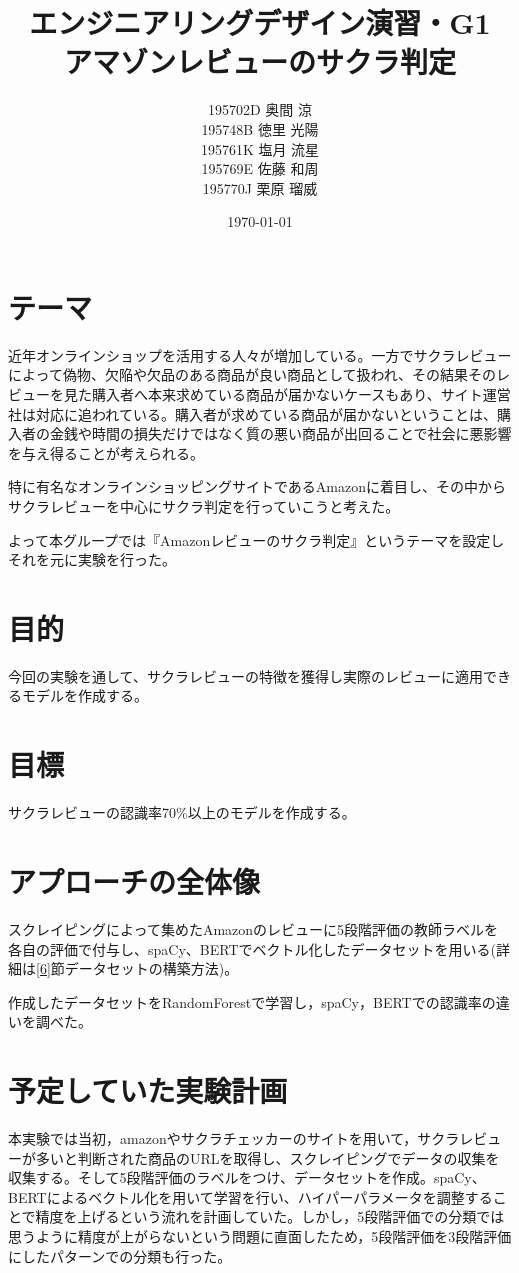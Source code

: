 \documentclass[a4paper,11pt,titlepage]{jsarticle}
\title{エンジニアリングデザイン演習・G1\\アマゾンレビューのサクラ判定}
\author{195702D  奥間 涼\\195748B 徳里 光陽\\195761K 塩月 流星\\195769E 佐藤 和周\\195770J 栗原 瑠威}
\date{\today}
\begin{document}
\maketitle
\tableofcontents
\clearpage
\section{テーマ}
近年オンラインショップを活用する人々が増加している。一方でサクラレビューによって偽物、欠陥や欠品のある商品が良い商品として扱われ、その結果そのレビューを見た購入者へ本来求めている商品が届かないケースもあり、サイト運営社は対応に追われている\cite{5}。購入者が求めている商品が届かないということは、購入者の金銭や時間の損失だけではなく質の悪い商品が出回ることで社会に悪影響を与え得ることが考えられる。

特に有名なオンラインショッピングサイトであるAmazonに着目し、その中からサクラレビューを中心にサクラ判定を行っていこうと考えた。

よって本グループでは『Amazonレビューのサクラ判定』というテーマを設定しそれを元に実験を行った。


\section{目的}
今回の実験を通して、サクラレビューの特徴を獲得し実際のレビューに適用できるモデルを作成する。

\section{目標}
サクラレビューの認識率70\%以上のモデルを作成する。

\section{アプローチの全体像}
スクレイピングによって集めたAmazonのレビューに5段階評価の教師ラベルを各自の評価で付与し、spaCy、BERTでベクトル化したデータセットを用いる(詳細は\ref{6}節データセットの構築方法)。

作成したデータセットをRandomForestで学習し，spaCy，BERTでの認識率の違いを調べた。

\section{予定していた実験計画}
本実験では当初，amazonやサクラチェッカー\cite{3}のサイトを用いて，サクラレビューが多いと判断された商品のURLを取得し、スクレイピングでデータの収集を収集する。そして5段階評価のラベルをつけ、データセットを作成。spaCy、BERTによるベクトル化を用いて学習を行い、ハイパーパラメータを調整することで精度を上げるという流れを計画していた。しかし，5段階評価での分類では思うように精度が上がらないという問題に直面したため，5段階評価を3段階評価にしたパターンでの分類も行った。
\end{document}
